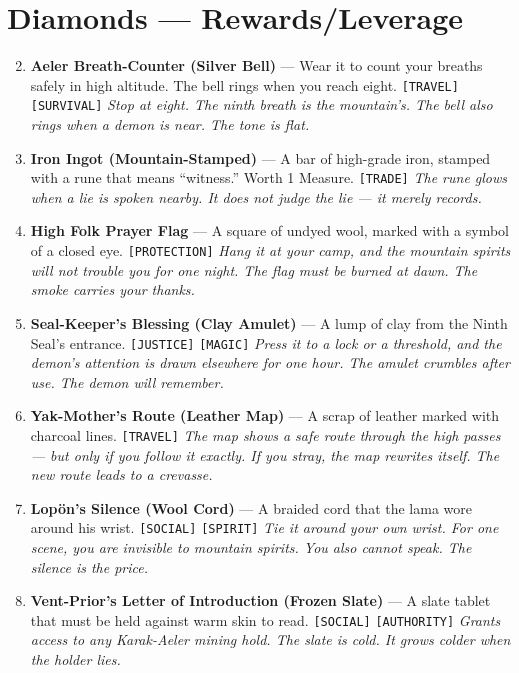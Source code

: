 \section*{Diamonds --- Rewards/Leverage}
\label{sec:himadri-rewards}
\begin{enumerate}
\setcounter{enumi}{1}
\item \textbf{Aeler Breath-Counter (Silver Bell)} --- Wear it to count your breaths safely in high altitude. The bell rings when you reach eight. \texttt{[TRAVEL]} \texttt{[SURVIVAL]}
  \hfill \textit{Stop at eight. The ninth breath is the mountain's. The bell also rings when a demon is near. The tone is flat.}
\item \textbf{Iron Ingot (Mountain-Stamped)} --- A bar of high-grade iron, stamped with a rune that means ``witness.'' Worth 1 Measure. \texttt{[TRADE]}
  \hfill \textit{The rune glows when a lie is spoken nearby. It does not judge the lie --- it merely records.}
\item \textbf{High Folk Prayer Flag} --- A square of undyed wool, marked with a symbol of a closed eye. \texttt{[PROTECTION]}
  \hfill \textit{Hang it at your camp, and the mountain spirits will not trouble you for one night. The flag must be burned at dawn. The smoke carries your thanks.}
\item \textbf{Seal-Keeper's Blessing (Clay Amulet)} --- A lump of clay from the Ninth Seal's entrance. \texttt{[JUSTICE]} \texttt{[MAGIC]}
  \hfill \textit{Press it to a lock or a threshold, and the demon's attention is drawn elsewhere for one hour. The amulet crumbles after use. The demon will remember.}
\item \textbf{Yak-Mother's Route (Leather Map)} --- A scrap of leather marked with charcoal lines. \texttt{[TRAVEL]}
  \hfill \textit{The map shows a safe route through the high passes --- but only if you follow it exactly. If you stray, the map rewrites itself. The new route leads to a crevasse.}
\item \textbf{Lopön's Silence (Wool Cord)} --- A braided cord that the lama wore around his wrist. \texttt{[SOCIAL]} \texttt{[SPIRIT]}
  \hfill \textit{Tie it around your own wrist. For one scene, you are invisible to mountain spirits. You also cannot speak. The silence is the price.}
\item \textbf{Vent-Prior's Letter of Introduction (Frozen Slate)} --- A slate tablet that must be held against warm skin to read. \texttt{[SOCIAL]} \texttt{[AUTHORITY]}
  \hfill \textit{Grants access to any Karak-Aeler mining hold. The slate is cold. It grows colder when the holder lies.}

\end{enumerate}
